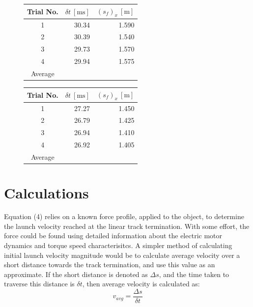 \documentclass[a4paper]{article}
\begin{document}
\begin{figure}[h]
	\begin{minipage}{0.45\textwidth}
		\centering
		\begin{tabular}{crr}
			\toprule
			Trial No. & $\delta t \ [\si{\milli\second}]$ & $(s_f)_x \ [\si{\meter}]$\\
			\midrule
			1 & 30.34 & 1.590\\
			2 & 30.39 & 1.540\\
			3 & 29.73 & 1.570\\
			4 & 29.94 & 1.575\\
			\midrule
			Average & & \\
			\bottomrule
		\end{tabular}
	\end{minipage}
	\hspace{1cm}
	\begin{minipage}{0.45\textwidth}
		\centering
		\begin{tabular}{crr}
			\toprule
			Trial No. & $\delta t \ [\si{\milli\second}]$ & $(s_f)_x \ [\si{\meter}]$\\
			\midrule
			1 & 27.27 & 1.450\\
			2 & 26.79 & 1.425\\
			3 & 26.94 & 1.410\\
			4 & 26.92 & 1.405\\
			\midrule
			Average & & \\
			\bottomrule
		\end{tabular}
	\end{minipage}
\end{figure}

\newpage

\section{Calculations}
Equation (4) relies on a known force profile, applied to the object, to determine the launch velocity reached at the linear track termination. With some effort, the force could be found using detailed information about the electric motor dynamics and torque speed characterisitcs. A simpler method of calculating initial launch velocity magnitude would be to calculate average velocity over a short distance towards the track termination, and use this value as an approximate. If the short distance is denoted as $\Delta s$, and the time taken to traverse this distance is $\delta t$, then average velocity is calculated as:
\begin{equation}
v_{avg} = \frac{\Delta s}{\delta t}
\end{equation}
\end{document}

